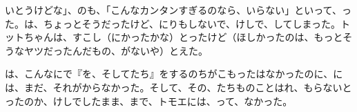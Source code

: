 いとうけどな」、のも、「こんなカンタンすぎるのなら、いらない」といって、った。は、ちょっとそうだったけど、にりもしないで、けしで、してしまった。トットちゃんは、すこし（にかったかな）とったけど（ほしかったのは、もっとそうなヤツだったんだもの、がないや）とえた。

は、こんなにで『を、そしてたち』をするのちがこもったはなかったのに、には、まだ、それがからなかった。そして、その、たちものことはれ、もらないとったのか、けしでしたまま、まで、トモエには、って、なかった。


